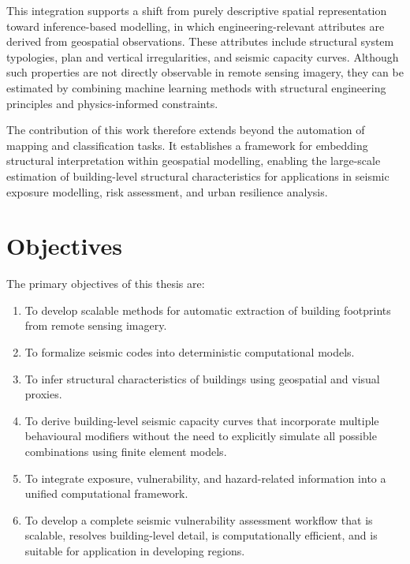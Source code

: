 This integration supports a shift from purely descriptive spatial representation toward inference-based modelling, in which engineering-relevant attributes are derived from geospatial observations. These attributes include structural system typologies, plan and vertical irregularities, and seismic capacity curves. Although such properties are not directly observable in remote sensing imagery, they can be estimated by combining machine learning methods with structural engineering principles and physics-informed constraints.

The contribution of this work therefore extends beyond the automation of mapping and classification tasks. It establishes a framework for embedding structural interpretation within geospatial modelling, enabling the large-scale estimation of building-level structural characteristics for applications in seismic exposure modelling, risk assessment, and urban resilience analysis.


\renewcommand{\sectionnametext}{Objectives}
\renewcommand{\headingtextR}{\thesection. \sectionnametext}
\section{\sectionnametext}

The primary objectives of this thesis are:

\begin{enumerate}
    \item To develop scalable methods for automatic extraction of building footprints from remote sensing imagery.
    \item To formalize seismic codes into deterministic computational models.
    \item To infer structural characteristics of buildings using geospatial and visual proxies.
    \item To derive building-level seismic capacity curves that incorporate multiple behavioural modifiers without the need to explicitly simulate all possible combinations using finite element models.
    \item To integrate exposure, vulnerability, and hazard-related information into a unified computational framework.
    \item To develop a complete seismic vulnerability assessment workflow that is scalable, resolves building-level detail, is computationally efficient, and is suitable for application in developing regions.
\end{enumerate}


